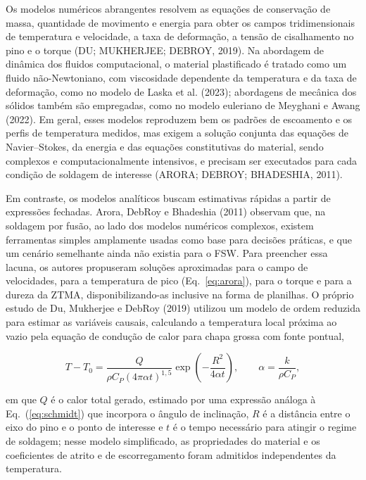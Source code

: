 \documentclass[12pt,openany]{report}
\begin{document}
Os modelos numéricos abrangentes resolvem as equações de conservação de massa, quantidade de movimento e energia para obter os campos tridimensionais de temperatura e velocidade, a taxa de deformação, a tensão de cisalhamento no pino e o torque (DU; MUKHERJEE; DEBROY, 2019). Na abordagem de dinâmica dos fluidos computacional, o material plastificado é tratado como um fluido não-Newtoniano, com viscosidade dependente da temperatura e da taxa de deformação, como no modelo de Laska et al. (2023); abordagens de mecânica dos sólidos também são empregadas, como no modelo euleriano de Meyghani e Awang (2022). Em geral, esses modelos reproduzem bem os padrões de escoamento e os perfis de temperatura medidos, mas exigem a solução conjunta das equações de Navier--Stokes, da energia e das equações constitutivas do material, sendo complexos e computacionalmente intensivos, e precisam ser executados para cada condição de soldagem de interesse (ARORA; DEBROY; BHADESHIA, 2011).

Em contraste, os modelos analíticos buscam estimativas rápidas a partir de expressões fechadas. Arora, DebRoy e Bhadeshia (2011) observam que, na soldagem por fusão, ao lado dos modelos numéricos complexos, existem ferramentas simples amplamente usadas como base para decisões práticas, e que um cenário semelhante ainda não existia para o FSW. Para preencher essa lacuna, os autores propuseram soluções aproximadas para o campo de velocidades, para a temperatura de pico (Eq.~\ref{eq:arora}), para o torque e para a dureza da ZTMA, disponibilizando-as inclusive na forma de planilhas. O próprio estudo de Du, Mukherjee e DebRoy (2019) utilizou um modelo de ordem reduzida para estimar as variáveis causais, calculando a temperatura local próxima ao vazio pela equação de condução de calor para chapa grossa com fonte pontual,

\begin{equation}
T - T_{0} = \frac{Q}{\rho C_{P}\left(4\pi\alpha t\right)^{1{,}5}}\exp\left(-\frac{R^{2}}{4\alpha t}\right), \qquad \alpha = \frac{k}{\rho C_{P}},
\label{eq:du_conducao}
\end{equation}

\noindent em que $Q$ é o calor total gerado, estimado por uma expressão análoga à Eq.~(\ref{eq:schmidt}) que incorpora o ângulo de inclinação, $R$ é a distância entre o eixo do pino e o ponto de interesse e $t$ é o tempo necessário para atingir o regime de soldagem; nesse modelo simplificado, as propriedades do material e os coeficientes de atrito e de escorregamento foram admitidos independentes da temperatura.
\end{document}
